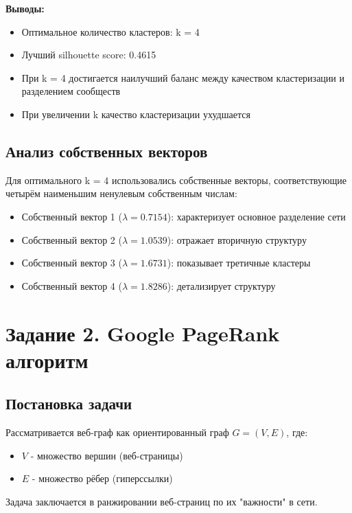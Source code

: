 \textbf{Выводы:}
\begin{itemize}
    \item Оптимальное количество кластеров: k = 4
    \item Лучший silhouette score: 0.4615
    \item При k = 4 достигается наилучший баланс между качеством кластеризации и разделением сообществ
    \item При увеличении k качество кластеризации ухудшается
\end{itemize}

\subsection*{Анализ собственных векторов}

Для оптимального k = 4 использовались собственные векторы, соответствующие четырём наименьшим ненулевым собственным числам:

\begin{itemize}
    \item Собственный вектор 1 ($\lambda = 0.7154$): характеризует основное разделение сети
    \item Собственный вектор 2 ($\lambda = 1.0539$): отражает вторичную структуру
    \item Собственный вектор 3 ($\lambda = 1.6731$): показывает третичные кластеры
    \item Собственный вектор 4 ($\lambda = 1.8286$): детализирует структуру
\end{itemize}

\section*{Задание 2. Google PageRank алгоритм}

\subsection*{Постановка задачи}

Рассматривается веб-граф как ориентированный граф $G = (V, E)$, где:
\begin{itemize}
    \item $V$ - множество вершин (веб-страницы)
    \item $E$ - множество рёбер (гиперссылки)
\end{itemize}

Задача заключается в ранжировании веб-страниц по их "важности" в сети.

